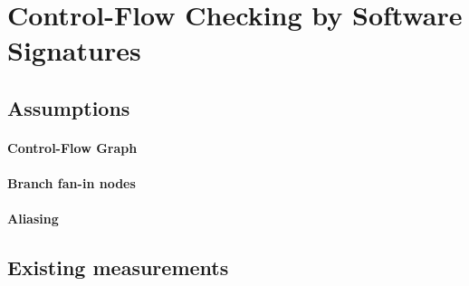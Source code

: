 \section{Control-Flow Checking by Software Signatures}


\subsection{Assumptions}


\paragraph{Control-Flow Graph}


\paragraph{Branch fan-in nodes}


\paragraph{Aliasing}


\subsection{Existing measurements}

